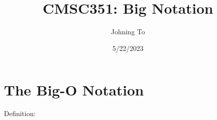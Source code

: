 \documentclass{article}
\title {CMSC351: Big Notation}
\author{Johning To}
\date{5/22/2023}
\begin{document}
\maketitle

\section{The Big-O Notation}
Definition: 
\end{document}
